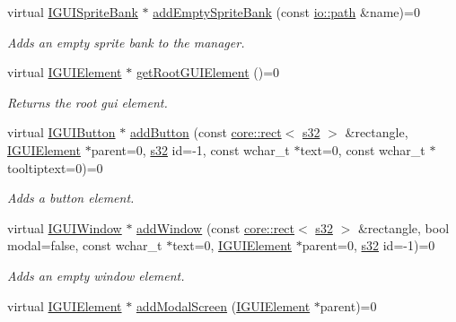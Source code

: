 \begin{DoxyCompactItemize}
virtual \hyperlink{classirr_1_1gui_1_1IGUISpriteBank}{I\+G\+U\+I\+Sprite\+Bank} $\ast$ \hyperlink{classirr_1_1gui_1_1IGUIEnvironment_a62f34cdf4dd600a35eaf37d856579d98}{add\+Empty\+Sprite\+Bank} (const \hyperlink{namespaceirr_1_1io_a6468281622ce3a1c46b72e19f32dded5}{io\+::path} \&name)=0
\begin{DoxyCompactList}\small\item\em Adds an empty sprite bank to the manager. \end{DoxyCompactList}\item 
virtual \hyperlink{classirr_1_1gui_1_1IGUIElement}{I\+G\+U\+I\+Element} $\ast$ \hyperlink{classirr_1_1gui_1_1IGUIEnvironment_a35fec6d5baa9b2f65aa9ee2c336104d4}{get\+Root\+G\+U\+I\+Element} ()=0
\begin{DoxyCompactList}\small\item\em Returns the root gui element. \end{DoxyCompactList}\item 
virtual \hyperlink{classirr_1_1gui_1_1IGUIButton}{I\+G\+U\+I\+Button} $\ast$ \hyperlink{classirr_1_1gui_1_1IGUIEnvironment_a666749b7352a677c74acb242199e54a0}{add\+Button} (const \hyperlink{classirr_1_1core_1_1rect}{core\+::rect}$<$ \hyperlink{namespaceirr_ac66849b7a6ed16e30ebede579f9b47c6}{s32} $>$ \&rectangle, \hyperlink{classirr_1_1gui_1_1IGUIElement}{I\+G\+U\+I\+Element} $\ast$parent=0, \hyperlink{namespaceirr_ac66849b7a6ed16e30ebede579f9b47c6}{s32} id=-\/1, const wchar\+\_\+t $\ast$text=0, const wchar\+\_\+t $\ast$tooltiptext=0)=0
\begin{DoxyCompactList}\small\item\em Adds a button element. \end{DoxyCompactList}\item 
virtual \hyperlink{classirr_1_1gui_1_1IGUIWindow}{I\+G\+U\+I\+Window} $\ast$ \hyperlink{classirr_1_1gui_1_1IGUIEnvironment_ac233dcbef643b5f7de9ab30ae5896e28}{add\+Window} (const \hyperlink{classirr_1_1core_1_1rect}{core\+::rect}$<$ \hyperlink{namespaceirr_ac66849b7a6ed16e30ebede579f9b47c6}{s32} $>$ \&rectangle, bool modal=false, const wchar\+\_\+t $\ast$text=0, \hyperlink{classirr_1_1gui_1_1IGUIElement}{I\+G\+U\+I\+Element} $\ast$parent=0, \hyperlink{namespaceirr_ac66849b7a6ed16e30ebede579f9b47c6}{s32} id=-\/1)=0
\begin{DoxyCompactList}\small\item\em Adds an empty window element. \end{DoxyCompactList}\item 
virtual \hyperlink{classirr_1_1gui_1_1IGUIElement}{I\+G\+U\+I\+Element} $\ast$ \hyperlink{classirr_1_1gui_1_1IGUIEnvironment_a8bdf2e97e3694da75205ad693d849219}{add\+Modal\+Screen} (\hyperlink{classirr_1_1gui_1_1IGUIElement}{I\+G\+U\+I\+Element} $\ast$parent)=0

\end{DoxyCompactItemize}
